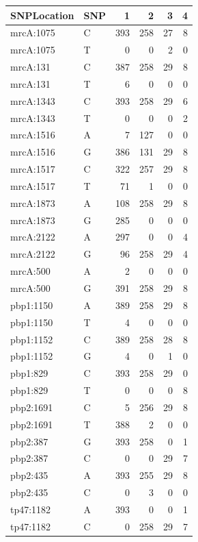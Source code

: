 \begin{table}[ht]
\centering
\begin{tabular}{llrrrr}
  \toprule
SNPLocation & SNP & 1 & 2 & 3 & 4 \\ 
  \midrule
mrcA:1075 & C & 393 & 258 & 27 & 8 \\ 
  mrcA:1075 & T & 0 & 0 & 2 & 0 \\ 
  mrcA:131 & C & 387 & 258 & 29 & 8 \\ 
  mrcA:131 & T & 6 & 0 & 0 & 0 \\ 
  mrcA:1343 & C & 393 & 258 & 29 & 6 \\ 
  mrcA:1343 & T & 0 & 0 & 0 & 2 \\ 
  mrcA:1516 & A & 7 & 127 & 0 & 0 \\ 
  mrcA:1516 & G & 386 & 131 & 29 & 8 \\ 
  mrcA:1517 & C & 322 & 257 & 29 & 8 \\ 
  mrcA:1517 & T & 71 & 1 & 0 & 0 \\ 
  mrcA:1873 & A & 108 & 258 & 29 & 8 \\ 
  mrcA:1873 & G & 285 & 0 & 0 & 0 \\ 
  mrcA:2122 & A & 297 & 0 & 0 & 4 \\ 
  mrcA:2122 & G & 96 & 258 & 29 & 4 \\ 
  mrcA:500 & A & 2 & 0 & 0 & 0 \\ 
  mrcA:500 & G & 391 & 258 & 29 & 8 \\ 
  pbp1:1150 & A & 389 & 258 & 29 & 8 \\ 
  pbp1:1150 & T & 4 & 0 & 0 & 0 \\ 
  pbp1:1152 & C & 389 & 258 & 28 & 8 \\ 
  pbp1:1152 & G & 4 & 0 & 1 & 0 \\ 
  pbp1:829 & C & 393 & 258 & 29 & 0 \\ 
  pbp1:829 & T & 0 & 0 & 0 & 8 \\ 
  pbp2:1691 & C & 5 & 256 & 29 & 8 \\ 
  pbp2:1691 & T & 388 & 2 & 0 & 0 \\ 
  pbp2:387 & G & 393 & 258 & 0 & 1 \\ 
  pbp2:387 & C & 0 & 0 & 29 & 7 \\ 
  pbp2:435 & A & 393 & 255 & 29 & 8 \\ 
  pbp2:435 & C & 0 & 3 & 0 & 0 \\ 
  tp47:1182 & A & 393 & 0 & 0 & 1 \\ 
  tp47:1182 & C & 0 & 258 & 29 & 7 \\ 

\end{tabular}
\end{table}
